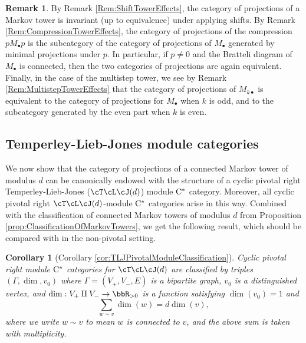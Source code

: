 \documentclass[11pt]{article}
\theoremstyle{plain}
\newtheorem*{cor*}{Corollary}
\theoremstyle{definition}
\newtheorem{rem}[thm]{Remark}
\newcommand{\Cstar}{\rm{C^*}}
\begin{document}
\begin{rem}
\label{rem:HowMCategoryChangesUnderMarkovTowerOperations}
By Remark \ref{Rem:ShiftTowerEffects}, the category of projections of a Markov tower is invariant (up to equivalence) under applying shifts. 
By Remark \ref{Rem:CompressionTowerEffects}, the category of projections of the compression $pM_\bullet p$ is the subcategory of the category of projections of $M_\bullet$ generated by minimal projections under $p$. 
In particular, if $p\neq 0$ and the Bratteli diagram of $M_\bullet$ is connected, then the two categories of projections are again equivalent. 
Finally, in the case of the multistep tower, we see by Remark \ref{Rem:MultistepTowerEffects} that the category of projections of $M_{k\bullet}$ is equivalent to the category of projections for $M_\bullet$ when $k$ is odd, and to the subcategory generated by the even part when $k$ is even.
\end{rem}

\subsection{Temperley-Lieb-Jones module categories} 
\label{sec:TLJmodules}

We now show that the category of projections of a connected Markov tower of modulus $d$ can be canonically endowed with the structure of a cyclic pivotal right Temperley-Lieb-Jones ($\cT\cL\cJ(d)$) module $\Cstar$ category.
Moreover, all cyclic pivotal right $\cT\cL\cJ(d)$-module $\Cstar$ categories arise in this way.
Combined with the classification of connected Markov towers of modulus $d$ from Proposition \ref{prop:ClassificationOfMarkovTowers}, we get the following result, which should be compared with \cite{MR3420332} in the non-pivotal setting.

\begin{cor*}[Corollary \ref{cor:TLJPivotalModuleClassification}]
Cyclic pivotal right module $\Cstar$ categories for $\cT\cL\cJ(d)$ are classified by triples $(\Gamma, \dim, v_0)$ where $\Gamma=(V_+, V_- , E)$ is a bipartite graph, $v_0$ is a distinguished vertex, and $\dim : V_+\amalg V_- \to \bbR_{>0}$ is a function satisfying $\dim(v_0) = 1$ and
$$
\sum_{w\sim v} \dim(w) = d \dim(v),
$$
where we write $w\sim v$ to mean $w$ is connected to $v$, and the above sum is taken with multiplicity.
\end{cor*}
\end{document}
